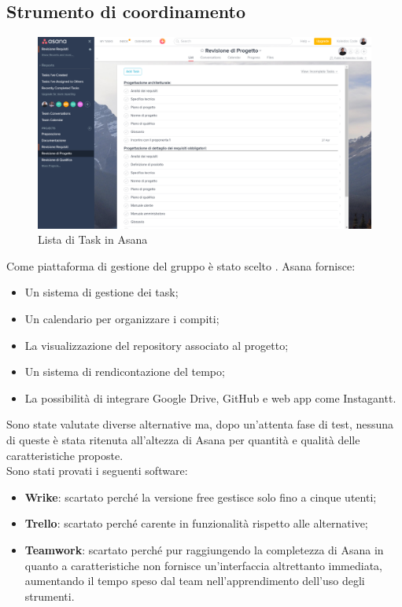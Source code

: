 \documentclass[../NormeDiProgetto.tex]{subfiles}
\begin{document}
		\subsection{Strumento di coordinamento}
			\begin{figure} [h!]
				\centering
				\includegraphics[scale=0.2]{./Immagini/Asana.png}
				\caption{Lista di Task in Asana}\label{}
			\end{figure}
			Come piattaforma di gestione del gruppo è stato scelto . Asana fornisce:
			\begin{itemize}
				\item Un sistema di gestione dei task;
				\item Un calendario per organizzare i compiti;
				\item La visualizzazione del repository associato al progetto;
				\item Un sistema di rendicontazione del tempo;
				\item La possibilità di integrare Google Drive, GitHub e web app come Instagantt.
			\end{itemize}
			Sono state valutate diverse alternative ma, dopo un'attenta fase di test, nessuna di queste è
			stata ritenuta all'altezza di Asana per quantità e qualità delle caratteristiche proposte.\\
			Sono stati provati i seguenti software:
			\begin{itemize}
				\item \textbf{Wrike}: scartato perché la versione free gestisce solo fino a cinque utenti;
				\item \textbf{Trello}: scartato perché carente in funzionalità rispetto alle alternative;  
				\item \textbf{Teamwork}: scartato perché pur raggiungendo la completezza di Asana in quanto
				a caratteristiche non fornisce un'interfaccia altrettanto immediata, aumentando il tempo
				speso dal team nell'apprendimento dell'uso degli strumenti.
			\end{itemize}
\end{document}
